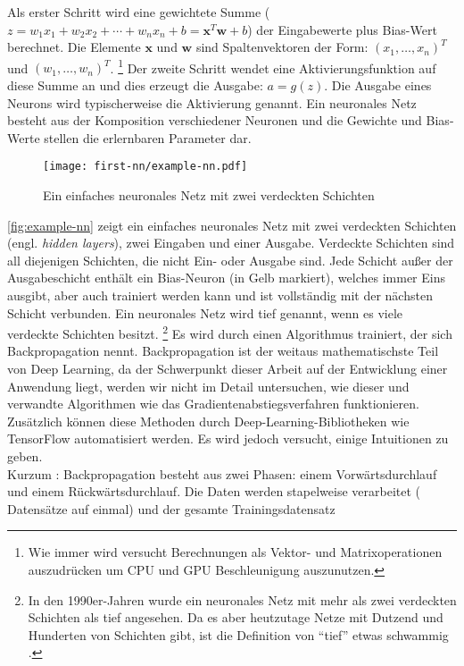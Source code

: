 \noindent
Als erster Schritt wird eine gewichtete Summe
($z = w_1x_1 + w_2x_2 +\dotsb+ w_nx_n + b = \mathbf{x}^T\mathbf{w} + b$)
der Eingabewerte plus Bias-Wert berechnet. Die Elemente $\mathbf{x}$ und $\mathbf{w}$
sind Spaltenvektoren der Form: $(x_1,\dotsc,x_n)^T$ und $(w_1,\dotsc,w_n)^T$.
\footnote{Wie immer wird versucht Berechnungen als Vektor- und Matrixoperationen
auszudrücken um CPU und GPU Beschleunigung auszunutzen.}
Der zweite Schritt wendet eine Aktivierungsfunktion auf diese Summe an und dies
erzeugt die Ausgabe: $a = g(z)$. Die Ausgabe eines Neurons
wird typischerweise die Aktivierung genannt. Ein neuronales Netz
besteht aus der Komposition verschiedener Neuronen und die
Gewichte und Bias-Werte stellen die erlernbaren Parameter dar.
\begin{figure}[h!]
  \centering
  \texttt{[image: first-nn/example-nn.pdf]}
  \caption{Ein einfaches neuronales Netz mit zwei verdeckten Schichten}
  \label{fig:example-nn}
\end{figure}
\noindent
\autoref{fig:example-nn} zeigt ein einfaches neuronales Netz
mit zwei verdeckten Schichten (engl. \textit{hidden layers}),
zwei Eingaben und einer Ausgabe.
Verdeckte Schichten sind all diejenigen Schichten, die nicht Ein- oder Ausgabe sind.
Jede Schicht außer der Ausgabeschicht enthält ein Bias-Neuron
(in Gelb markiert), welches immer Eins ausgibt, aber auch trainiert werden kann
und ist vollständig mit der nächsten Schicht verbunden.
Ein neuronales Netz wird tief genannt, wenn es viele verdeckte Schichten besitzt.
\footnote{In den 1990er-Jahren wurde ein neuronales Netz
mit mehr als zwei verdeckten Schichten als tief angesehen.
Da es aber heutzutage Netze mit Dutzend und Hunderten von Schichten
gibt, ist die Definition von \enquote{tief} etwas schwammig \parencite[289]{book:hands-on-ml}.}
Es wird durch einen Algorithmus trainiert, der
sich Backpropagation nennt.
Backpropagation ist der weitaus mathematischste Teil von
Deep Learning, da der Schwerpunkt dieser Arbeit auf der Entwicklung einer
Anwendung liegt, werden wir nicht im Detail untersuchen,
wie dieser und verwandte Algorithmen wie das Gradientenabstiegsverfahren
funktionieren. Zusätzlich können diese Methoden durch Deep-Learning-Bibliotheken
wie TensorFlow automatisiert werden. Es wird jedoch versucht, einige
Intuitionen zu geben.\\[8pt]
Kurzum \parencite[290-291]{book:hands-on-ml}:
Backpropagation besteht aus zwei Phasen: einem Vorwärtsdurchlauf
und einem Rückwärtsdurchlauf. Die Daten werden stapelweise verarbeitet
( Datensätze auf ein­mal) und der gesamte Trainingsdatensatz
